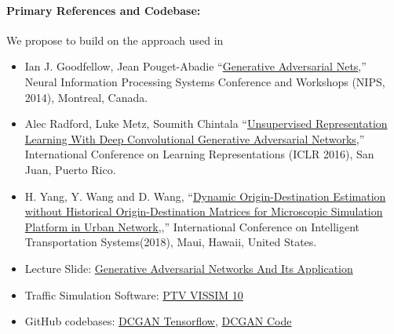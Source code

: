\documentclass[11pt]{article}
\begin{document}
\paragraph{Primary References and Codebase:}  We propose to build on the approach used in 

\begin{itemize} 
\item Ian J. Goodfellow, Jean Pouget-Abadie ``\href{https://papers.nips.cc/paper/5423-generative-adversarial-nets.pdf}{Generative Adversarial Nets},'' Neural Information Processing Systems Conference and Workshops (NIPS, 2014), Montreal, Canada.  
\item Alec Radford, Luke Metz, Soumith Chintala ``\href{https://arxiv.org/pdf/1511.06434.pdf}{Unsupervised Representation Learning
With Deep Convolutional Generative Adversarial Networks},'' International Conference on Learning Representations (ICLR 2016), San Juan, Puerto Rico.  
\item H. Yang, Y. Wang and D. Wang, ``\href{https://www.researchgate.net/publication/329615627_Dynamic_Origin-Destination_Estimation_without_Historical_Origin-Destination_Matrices_for_Microscopic_Simulation_Platform_in_Urban_Network}{Dynamic Origin-Destination Estimation without Historical Origin-Destination Matrices for Microscopic Simulation Platform in Urban Network,},'' International Conference on Intelligent Transportation Systems(2018), Maui, Hawaii, United States.  
\item Lecture Slide: \href{https://d1b10bmlvqabco.cloudfront.net/attach/jqbjkm8k8bd3as/jl30qxr2rxn3ll/jsvc86ulb9yq/Guest_Lecture_by_Jiali_Duan.pdf}{Generative Adversarial Networks And Its Application}
\item Traffic Simulation Software: \href{http://vision-traffic.ptvgroup.com/en-us/products/ptv-vissim/}{PTV VISSIM 10}
\item GitHub codebases: \href{https://github.com/carpedm20/DCGAN-tensorflow} {DCGAN Tensorflow},  
\href{https://github.com/Newmu/dcgan_code}{DCGAN Code}
\end{itemize} 
\end{document}
